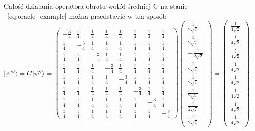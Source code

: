 \noindent
Całość działania operatora obrotu wokół średniej G na stanie ~\eqref{eq:oracle_example} można przedstawić w ten sposób \cite[s.~278, wz.~(5.368)]{inf_kwant}
\begin{equation}
\label{eq:matrix_example} 
|\psi'''\rangle = G|\psi''\rangle =
\begin{pmatrix}
-\frac{3}{4} & \frac{1}{4} & \frac{1}{4} & \frac{1}{4} & \frac{1}{4} & \frac{1}{4} & \frac{1}{4} & \frac{1}{4} \\
\frac{1}{4} & -\frac{3}{4} & \frac{1}{4} & \frac{1}{4} & \frac{1}{4} & \frac{1}{4} & \frac{1}{4} & \frac{1}{4} \\
\frac{1}{4} & \frac{1}{4} & -\frac{3}{4} & \frac{1}{4} & \frac{1}{4} & \frac{1}{4} & \frac{1}{4} & \frac{1}{4} \\
\frac{1}{4} & \frac{1}{4} & \frac{1}{4} & -\frac{3}{4} & \frac{1}{4} & \frac{1}{4} & \frac{1}{4} & \frac{1}{4} \\
\frac{1}{4} & \frac{1}{4} & \frac{1}{4} & \frac{1}{4} & -\frac{3}{4} & \frac{1}{4} & \frac{1}{4} & \frac{1}{4} \\
\frac{1}{4} & \frac{1}{4} & \frac{1}{4} & \frac{1}{4} & \frac{1}{4} & -\frac{3}{4} & \frac{1}{4} & \frac{1}{4} \\
\frac{1}{4} & \frac{1}{4} & \frac{1}{4} & \frac{1}{4} & \frac{1}{4} & \frac{1}{4} & -\frac{3}{4} & \frac{1}{4} \\
\frac{1}{4} & \frac{1}{4} & \frac{1}{4} & \frac{1}{4} & \frac{1}{4} & \frac{1}{4} & \frac{1}{4} & -\frac{3}{4}
\end{pmatrix}
\begin{pmatrix}
\frac{1}{2\sqrt{2}}\\
\frac{1}{2\sqrt{2}}\\
-\frac{1}{2\sqrt{2}}\\
\frac{1}{2\sqrt{2}}\\
\frac{1}{2\sqrt{2}}\\
\frac{1}{2\sqrt{2}}\\
\frac{1}{2\sqrt{2}}\\
\frac{1}{2\sqrt{2}}
\end{pmatrix}
=
\begin{pmatrix}
\frac{1}{4\sqrt{2}}\\
\frac{1}{4\sqrt{2}}\\
\frac{5}{4\sqrt{2}}\\
\frac{1}{4\sqrt{2}}\\
\frac{1}{4\sqrt{2}}\\
\frac{1}{4\sqrt{2}}\\
\frac{1}{4\sqrt{2}}\\
\frac{1}{4\sqrt{2}}
\end{pmatrix}.
\end{equation}

